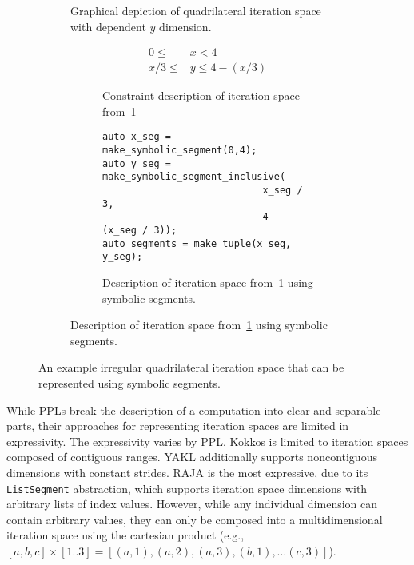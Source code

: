 \begin{figure}
\begin{subfigure}{0.42\columnwidth}
\caption{Graphical depiction of quadrilateral iteration space with dependent $y$ dimension.}\label{trapezoidIterationSpace1}
\end{subfigure}
\hspace{0.01\columnwidth}
\begin{subfigure}{0.53\columnwidth}
\begin{subfigure}{\columnwidth}
\begin{align}
	0 \leq &x < 4 \\
	x / 3 \leq &y \leq 4 - (x / 3)
\end{align}
\caption{Constraint description of iteration space from~\ref{trapezoidIterationSpace1}}\label{trapezoidConstraint1}
\end{subfigure}

\vspace{20pt}

\begin{subfigure}{\columnwidth}
\begin{lstlisting}[]
auto x_seg = make_symbolic_segment(0,4);
auto y_seg = make_symbolic_segment_inclusive(
							x_seg / 3, 
							4 - (x_seg / 3));
auto segments = make_tuple(x_seg, y_seg);
\end{lstlisting}
\caption{Description of iteration space from~\ref{trapezoidIterationSpace1} using symbolic segments.}\label{trapseg1}
\end{subfigure}
\end{subfigure}
\caption{An example irregular quadrilateral iteration space that can be represented using symbolic segments.}\label{trapezoid1}
\end{figure}




While PPLs break the description of a computation into clear and separable parts, their approaches for representing iteration spaces are limited in expressivity.
The expressivity varies by PPL\@.
Kokkos is limited to iteration spaces composed of contiguous ranges.
YAKL additionally supports noncontiguous dimensions with constant strides.
RAJA is the most expressive, due to its \verb.ListSegment. abstraction, which supports iteration space dimensions with arbitrary lists of index values.
However, while any individual dimension can contain arbitrary values, they can only be composed into a multidimensional iteration space using the cartesian product (e.g., $[a, b, c] \times [1..3] = [(a,1), (a,2), (a,3), (b,1), \dots (c,3)]$).

